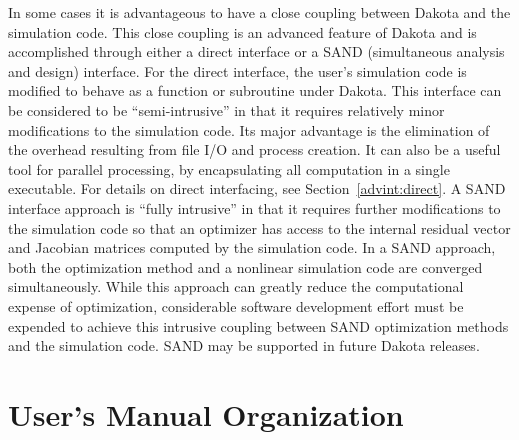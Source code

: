 In some cases it is advantageous to have a close coupling between
Dakota and the simulation code. This close coupling is an advanced
feature of Dakota and is accomplished through either a direct
interface or a SAND (simultaneous analysis and design) interface. For
the direct interface, the user's simulation code is modified to behave
as a function or subroutine under Dakota. This interface can be
considered to be ``semi-intrusive'' in that it requires relatively
minor modifications to the simulation code. Its major advantage is the
elimination of the overhead resulting from file I/O and process
creation. It can also be a useful tool for parallel processing, by
encapsulating all computation in a single executable.  For details on
direct interfacing, see Section~\ref{advint:direct}. A SAND interface
approach is ``fully intrusive'' in that it requires further
modifications to the simulation code so that an optimizer has access
to the internal residual vector and Jacobian matrices computed by the
simulation code. In a SAND approach, both the optimization method and
a nonlinear simulation code are converged simultaneously. While this
approach can greatly reduce the computational expense of optimization,
considerable software development effort must be expended to achieve
this intrusive coupling between SAND optimization methods and the
simulation code.  SAND may be supported in future Dakota releases.


\section{User's Manual Organization}\label{intro:organization}


